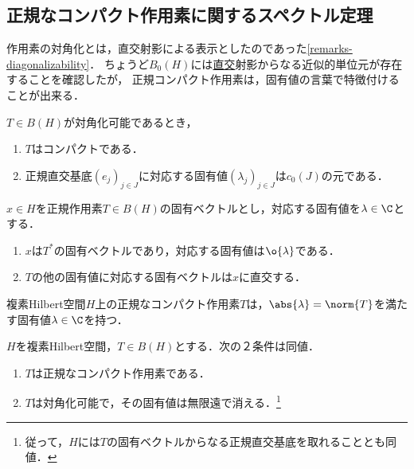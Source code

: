 \documentclass[uplatex,dvipdfmx]{jsreport}
\begin{document}
\subsection{正規なコンパクト作用素に関するスペクトル定理}

\begin{tcolorbox}[colframe=ForestGreen, colback=ForestGreen!10!white,breakable,colbacktitle=ForestGreen!40!white,coltitle=black,fonttitle=\bfseries\sffamily,
title=]
    作用素の対角化とは，直交射影による表示としたのであった\ref{remarks-diagonalizability}．
    ちょうど$B_0(H)$には\underline{直交}射影からなる近似的単位元が存在することを確認したが，
    正規コンパクト作用素は，固有値の言葉で特徴付けることが出来る．
\end{tcolorbox}

\begin{lemma}
    $T\in B(H)$が対角化可能であるとき，
    \begin{enumerate}
        \item $T$はコンパクトである．
        \item 正規直交基底$(e_j)_{j\in J}$に対応する固有値$(\lambda_j)_{j\in J}$は$c_0(J)$の元である．
    \end{enumerate}
\end{lemma}

\begin{lemma}
    $x\in H$を正規作用素$T\in B(H)$の固有ベクトルとし，対応する固有値を$\lambda\in\C$とする．
    \begin{enumerate}
        \item $x$は$T^*$の固有ベクトルであり，対応する固有値は$\o{\lambda}$である．
        \item $T$の他の固有値に対応する固有ベクトルは$x$に直交する．
    \end{enumerate}
\end{lemma}

\begin{lemma}
    複素Hilbert空間$H$上の正規なコンパクト作用素$T$は，$\abs{\lambda}=\norm{T}$を満たす固有値$\lambda\in\C$を持つ．
\end{lemma}

\begin{theorem}[正規コンパクト作用素の特徴付け]\label{thm-Spectral-Theorem-for-normal-compact-operator}
    $H$を複素Hilbert空間，$T\in B(H)$とする．次の２条件は同値．
    \begin{enumerate}
        \item $T$は正規なコンパクト作用素である．
        \item $T$は対角化可能で，その固有値は無限遠で消える．\footnote{従って，$H$には$T$の固有ベクトルからなる正規直交基底を取れることとも同値．}
    \end{enumerate}
\end{theorem}
\end{document}
